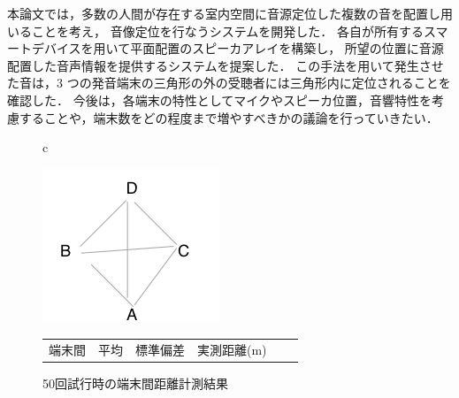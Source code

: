 本論文では，多数の人間が存在する室内空間に音源定位した複数の音を配置し用いることを考え，
音像定位を行なうシステムを開発した．
各自が所有するスマートデバイスを用いて平面配置のスピーカアレイを構築し，
所望の位置に音源配置した音声情報を提供するシステムを提案した．
この手法を用いて発生させた音は，3 つの発音端末の三角形の外の受聴者には三角形内に定位されることを確認した．
今後は，各端末の特性としてマイクやスピーカ位置，音響特性を考慮することや，端末数をどの程度まで増やすべきかの議論を行っていきたい．

\begin{figure}[p]
  \begin{center}
    \begin{tabular}{c}
      \begin{minipage}{0.3\hsize}
        \begin{center}
          \hspace{-2mm}\includegraphics[clip,width=1\hsize]{img/PC_haichi.png}
          \caption{PC配置}
          \label{fig:__relpos}
        \end{center}
      \end{minipage}
      \begin{minipage}{0.68\hsize}
        \begin{center}
          \caption{50回試行時の端末間距離計測結果}
          \begin{tabular}{l|rrrrr}
            \hline
            {\footnotesize  端末間}&{\footnotesize 平均}&{\footnotesize 標準偏差}&{\footnotesize 実測距離(m) }\\

\end{tabular}
\end{center}
\end{minipage}
\end{tabular}
\end{center}
\end{figure}
